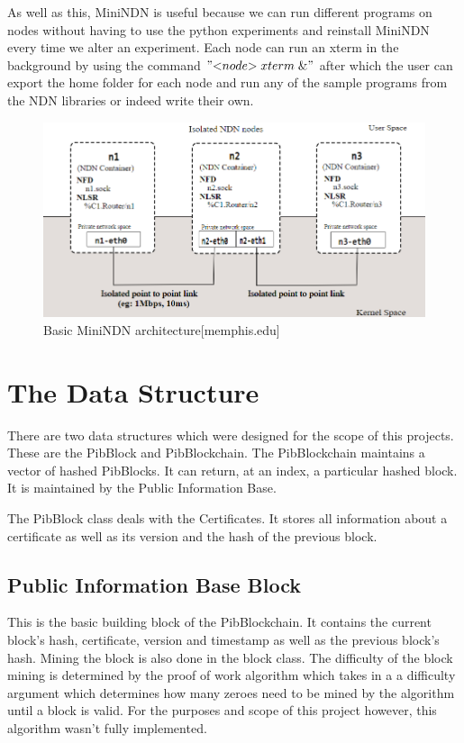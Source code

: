  As well as this, MiniNDN is useful because we can run different programs on nodes without having to use the python experiments and reinstall MiniNDN every time we alter an experiment. Each node can run an xterm in the background by using the command $"{<}node{>} \; xterm \; \& "$ after which the user can export the home folder for each node and run any of the sample programs from the NDN libraries or indeed write their own. 
\begin{figure}

\includegraphics[width=6in]{minindn}
\caption{Basic MiniNDN architecture[memphis.edu]}
\end{figure}

\section{The Data Structure}
There are two data structures which were designed for the scope of this projects. These are the PibBlock and PibBlockchain. The PibBlockchain maintains a vector of hashed PibBlocks. It can return, at an index, a particular hashed block. It is maintained by the Public Information Base. 

The PibBlock class deals with the Certificates. It stores all information about a certificate as well as its version and the hash of the previous block.
\subsection{Public Information Base Block}
This is the basic building block of the PibBlockchain. It contains the current block's hash, certificate, version and timestamp as well as the previous block's hash. Mining the block is also done in the block class. The difficulty of the block mining is determined by the proof of work algorithm which takes in a a difficulty argument which determines how many zeroes need to be mined by the algorithm until a block is valid. For the purposes and scope of this project however, this algorithm wasn't fully implemented. 

